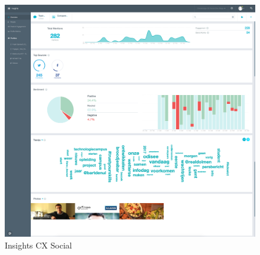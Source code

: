 \begin{figure}[H]
	\centering
	\includegraphics[width=1\textwidth]{Figuren/Insights.png}
	\caption{Insights CX Social \cite{EngagorScreenshots}} %
	\label{fig:Insights}
\end{figure} 








\iffalse
